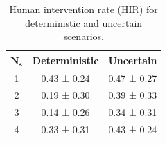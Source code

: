 \begin{table}[t]
\centering
\small
\begin{tabular}{c|cc}
\toprule
$\boldsymbol{N_s}$ & \textbf{Deterministic} & \textbf{Uncertain} \\
\midrule
1 & 0.43 ± 0.24 & 0.47 ± 0.27 \\
2 & 0.19 ± 0.30 & 0.39 ± 0.33 \\
3 & 0.14 ± 0.26 & 0.34 ± 0.31 \\
4 & 0.33 ± 0.31 & 0.43 ± 0.24 \\
\bottomrule
\end{tabular}
\caption{Human intervention rate (HIR) for deterministic and uncertain scenarios.}
\label{tab:human_intervention_rate}
\end{table}